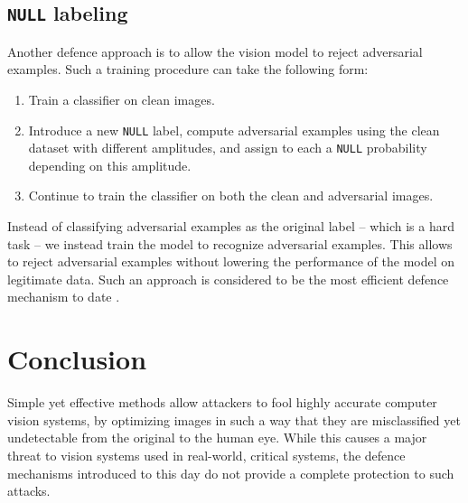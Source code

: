 \documentclass[twocolumn]{../../cs-classes/cs-classes}
\begin{document}
\subsection{\texorpdfstring{\texttt{NULL}}{NULL} labeling}
Another defence approach is to allow the vision model to reject adversarial examples. Such a training procedure can take the following form:
\begin{enumerate}
    \item Train a classifier on clean images.
    \item Introduce a new \texttt{NULL} label, compute adversarial examples using the clean dataset with different amplitudes, and assign to each a \texttt{NULL} probability depending on this amplitude.
    \item Continue to train the classifier on both the clean and adversarial images.
\end{enumerate}
Instead of classifying adversarial examples as the original label -- which is a hard task -- we instead train the model to recognize adversarial examples. This allows to reject adversarial examples without lowering the performance of the model on legitimate data. Such an approach is considered to be the most efficient defence mechanism to date \cite{chakraborty2021survey}.

\section{Conclusion}
Simple yet effective methods allow attackers to fool highly accurate computer vision systems, by optimizing images in such a way that they are misclassified yet undetectable from the original to the human eye. While this causes a major threat to vision systems used in real-world, critical systems, the defence mechanisms introduced to this day do not provide a complete protection to such attacks.

\nocite{*}
\printbibliography
\end{document}
